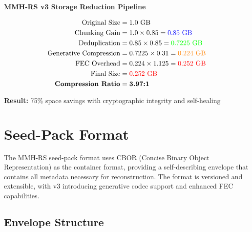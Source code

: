 \documentclass[11pt,a4paper]{article}
\begin{document}
	\begin{calloutbox}
	\centering
	\textbf{\Large MMH-RS v3 Storage Reduction Pipeline}
	
	\vspace{0.5cm}
	\begin{align*}
	\text{Original Size} &= 1.0 \text{ GB} \\
	\text{Chunking Gain} &= 1.0 \times 0.85 = \textcolor{blue}{0.85 \text{ GB}} \\
	\text{Deduplication} &= 0.85 \times 0.85 = \textcolor{green}{0.7225 \text{ GB}} \\
	\text{Generative Compression} &= 0.7225 \times 0.31 = \textcolor{orange}{0.224 \text{ GB}} \\
	\text{FEC Overhead} &= 0.224 \times 1.125 = \textcolor{red}{0.252 \text{ GB}} \\
	\text{Final Size} &= \textcolor{red}{0.252 \text{ GB}} \\
	\textbf{Compression Ratio} &= \textbf{3.97:1}
	\end{align*}
	
	\vspace{0.3cm}
	\textbf{Result:} 75\% space savings with cryptographic integrity and self-healing
	\end{calloutbox}
	
	\section{Seed-Pack Format}
	\label{sec:format}
	
	The MMH-RS seed-pack format uses CBOR (Concise Binary Object Representation) as the container format, providing a self-describing envelope that contains all metadata necessary for reconstruction. The format is versioned and extensible, with v3 introducing generative codec support and enhanced FEC capabilities.
	
	\subsection{Envelope Structure}
	
\end{document}
